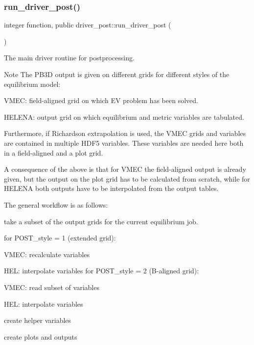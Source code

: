 \subsubsection{\texorpdfstring{run\+\_\+driver\+\_\+post()}{run\_driver\_post()}}
{\footnotesize\ttfamily integer function, public driver\+\_\+post\+::run\+\_\+driver\+\_\+post (\begin{DoxyParamCaption}{ }\end{DoxyParamCaption})}



The main driver routine for postprocessing. 

\begin{DoxyNote}{Note}
The P\+B3D output is given on different grids for different styles of the equilibrium model\+:
\begin{DoxyItemize}
\item V\+M\+EC\+: field-\/aligned grid on which EV problem has been solved.
\item H\+E\+L\+E\+NA\+: output grid on which equilibrium and metric variables are tabulated.
\end{DoxyItemize}
\end{DoxyNote}
Furthermore, if Richardson extrapolation is used, the V\+M\+EC grids and variables are contained in multiple H\+D\+F5 variables. These variables are needed here both in a field-\/aligned and a plot grid.

A consequence of the above is that for V\+M\+EC the field-\/aligned output is already given, but the output on the plot grid has to be calculated from scratch, while for H\+E\+L\+E\+NA both outputs have to be interpolated from the output tables.

The general workflow is as follows\+:
\begin{DoxyItemize}
\item take a subset of the output grids for the current equilibrium job.
\item for {\ttfamily P\+O\+S\+T\+\_\+style = 1} (extended grid)\+:
\begin{DoxyItemize}
\item V\+M\+EC\+: recalculate variables
\item H\+EL\+: interpolate variables for {\ttfamily P\+O\+S\+T\+\_\+style = 2} (B-\/aligned grid)\+:
\item V\+M\+EC\+: read subset of variables
\item H\+EL\+: interpolate variables
\end{DoxyItemize}
\item create helper variables
\item create plots and outputs
\end{DoxyItemize}

